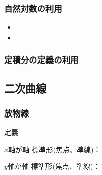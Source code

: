 \documentclass[10pt,dvipdfmx]{jsarticle}
\begin{document}
\subsubsection*{自然対数の利用}
\begin{Large}
  \begin{itemize}
    \item
    \item
  \end{itemize}
\end{Large}

\subsubsection*{定積分の定義の利用}
\vspace{15mm}

\newpage
\subsection*{二次曲線}
\subsubsection*{放物線}
\begin{itembox}[l]{定義}
  \vspace{8mm}
\end{itembox}

\begin{multicols}{2}
  \begin{minipage}{0.45\textwidth}
    \begin{itembox}[l]{$x$軸が軸}
      標準形(焦点、準線)：\\
      \begin{center}
      \end{center}
    \end{itembox}

  \end{minipage}
  \begin{minipage}{0.45\textwidth}
    \begin{itembox}[l]{$y$軸が軸}
      標準形(焦点、準線)：\\
      \begin{center}
      \end{center}

    \end{itembox}
  \end{minipage}
\end{multicols}
\end{document}
